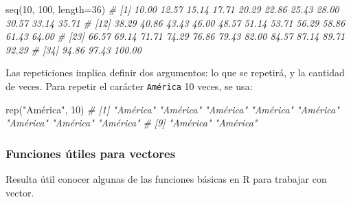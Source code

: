 \documentclass[
]{article}
\newenvironment{Shaded}{\begin{snugshade}}{\end{snugshade}}
\newcommand{\AttributeTok}[1]{\textcolor[rgb]{0.77,0.63,0.00}{#1}}
\newcommand{\CommentTok}[1]{\textcolor[rgb]{0.56,0.35,0.01}{\textit{#1}}}
\newcommand{\DecValTok}[1]{\textcolor[rgb]{0.00,0.00,0.81}{#1}}
\newcommand{\FunctionTok}[1]{\textcolor[rgb]{0.00,0.00,0.00}{#1}}
\newcommand{\NormalTok}[1]{#1}
\newcommand{\StringTok}[1]{\textcolor[rgb]{0.31,0.60,0.02}{#1}}
\theoremstyle{definition}
\theoremstyle{definition}
\theoremstyle{definition}
\theoremstyle{definition}
\theoremstyle{remark}
\begin{document}
\begin{Shaded}
\begin{Highlighting}[]
\FunctionTok{seq}\NormalTok{(}\DecValTok{10}\NormalTok{, }\DecValTok{100}\NormalTok{, }\AttributeTok{length=}\DecValTok{36}\NormalTok{)}
\CommentTok{\#  [1]  10.00  12.57  15.14  17.71  20.29  22.86  25.43  28.00  30.57  33.14  35.71}
\CommentTok{\# [12]  38.29  40.86  43.43  46.00  48.57  51.14  53.71  56.29  58.86  61.43  64.00}
\CommentTok{\# [23]  66.57  69.14  71.71  74.29  76.86  79.43  82.00  84.57  87.14  89.71  92.29}
\CommentTok{\# [34]  94.86  97.43 100.00}
\end{Highlighting}
\end{Shaded}

Las repeticiones implica definir dos argumentos: lo que se repetirá, y la cantidad de veces. Para repetir el carácter \texttt{América} 10 veces, se usa:

\begin{Shaded}
\begin{Highlighting}[]
\FunctionTok{rep}\NormalTok{(}\StringTok{"América"}\NormalTok{, }\DecValTok{10}\NormalTok{)}
\CommentTok{\#  [1] "América" "América" "América" "América" "América" "América" "América" "América"}
\CommentTok{\#  [9] "América" "América"}
\end{Highlighting}
\end{Shaded}

\hypertarget{funciones-uxfatiles-para-vectores}{%
\subsubsection{Funciones útiles para vectores}\label{funciones-uxfatiles-para-vectores}}

Resulta útil conocer algunas de las funciones básicas en R para trabajar con vector.
\end{document}
